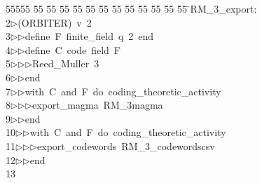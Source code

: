 %
%
\begin{tabbing}
55555 \= 55 \= 55 \= 55 \= 55 \= 55 \= 55 \= 55 \= 55 \= 55 \= 55 \= 55 \= 55 \= \>RM\_3\_export:\\[0pt]
2\>$\triangleright$\>(ORBITER)\ v\ 2\ \\[0pt]
3\>$\triangleright$\>$\triangleright$\>define\ F\ finite\_field\ q\ 2\ end\ \\[0pt]
4\>$\triangleright$\>$\triangleright$\>define\ C\ code\ field\ F\ \\[0pt]
5\>$\triangleright$\>$\triangleright$\>$\triangleright$\>Reed\_Muller\ 3\ \\[0pt]
6\>$\triangleright$\>$\triangleright$\>end\ \\[0pt]
7\>$\triangleright$\>$\triangleright$\>with\ C\ and\ F\ do\ coding\_theoretic\_activity\ \\[0pt]
8\>$\triangleright$\>$\triangleright$\>$\triangleright$\>export\_magma\ RM\_3magma\ \\[0pt]
9\>$\triangleright$\>$\triangleright$\>end\ \\[0pt]
10\>$\triangleright$\>$\triangleright$\>with\ C\ and\ F\ do\ coding\_theoretic\_activity\ \\[0pt]
11\>$\triangleright$\>$\triangleright$\>$\triangleright$\>export\_codewords\ RM\_3\_codewordscsv\ \\[0pt]
12\>$\triangleright$\>$\triangleright$\>end\ \\[0pt]
13\>\end{tabbing}
